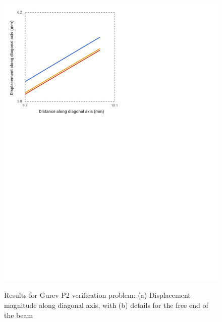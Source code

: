\begin{figure}[ht]
{		\includegraphics[scale=0.45]{media/5-verif/1-gurev2/gurev2-2.pdf}
\label{fig:gurev2-2}}		
%
\caption{Results for Gurev P2 verification problem: (a) Displacement magnitude along diagonal axis, with (b) details for the free end of the beam}
\label{fig:gurev2}
\end{figure}
\vspace{18mm}
